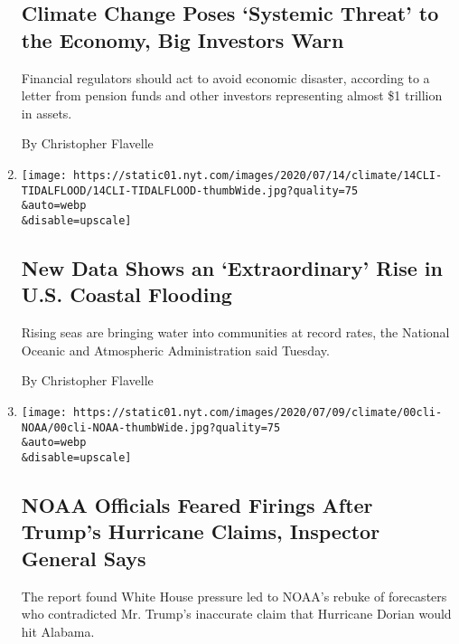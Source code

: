 \begin{enumerate}
{  \subsection{Climate Change Poses `Systemic Threat' to the Economy, Big
  Investors
  Warn}\label{climate-change-poses-systemic-threat-to-the-economy-big-investors-warn}}

  Financial regulators should act to avoid economic disaster, according
  to a letter from pension funds and other investors representing almost
  \$1 trillion in assets.

  By Christopher Flavelle
\item
  \href{/2020/07/14/climate/coastal-flooding-noaa.html}{}

  \texttt{[image: https://static01.nyt.com/images/2020/07/14/climate/14CLI-TIDALFLOOD/14CLI-TIDALFLOOD-thumbWide.jpg?quality=75\\\&auto=webp\\\&disable=upscale]}

  \hypertarget{new-data-shows-an-extraordinary-rise-in-us-coastal-flooding}{%
  \subsection{New Data Shows an `Extraordinary' Rise in U.S. Coastal
  Flooding}\label{new-data-shows-an-extraordinary-rise-in-us-coastal-flooding}}

  Rising seas are bringing water into communities at record rates, the
  National Oceanic and Atmospheric Administration said Tuesday.

  By Christopher Flavelle
\item
  \href{/2020/07/09/climate/trump-hurricane-dorian-noaa.html}{}

  \texttt{[image: https://static01.nyt.com/images/2020/07/09/climate/00cli-NOAA/00cli-NOAA-thumbWide.jpg?quality=75\\\&auto=webp\\\&disable=upscale]}

  \hypertarget{noaa-officials-feared-firings-after-trumps-hurricane-claims-inspector-general-says}{%
  \subsection{NOAA Officials Feared Firings After Trump's Hurricane
  Claims, Inspector General
  Says}\label{noaa-officials-feared-firings-after-trumps-hurricane-claims-inspector-general-says}}

  The report found White House pressure led to NOAA's rebuke of
  forecasters who contradicted Mr. Trump's inaccurate claim that
  Hurricane Dorian would hit Alabama.


\end{enumerate}
